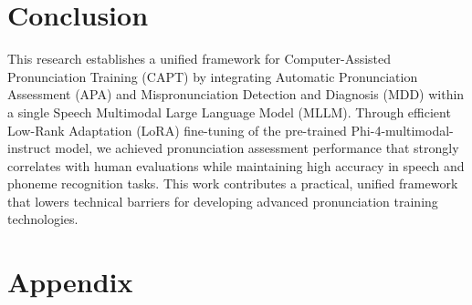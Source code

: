 \documentclass[sigconf,nonacm]{acmart}
\begin{document}
\section{Conclusion}
This research establishes a unified framework for Computer-Assisted Pronunciation Training (CAPT) by integrating Automatic Pronunciation Assessment (APA) and Mispronunciation Detection and Diagnosis (MDD) within a single Speech Multimodal Large Language Model (MLLM).
Through efficient Low-Rank Adaptation (LoRA) fine-tuning of the pre-trained Phi-4-multimodal-instruct model, we achieved pronunciation assessment performance that strongly correlates with human evaluations while maintaining high accuracy in speech and phoneme recognition tasks. This work contributes a practical, unified framework that lowers technical barriers for developing advanced pronunciation training technologies.

\section{Appendix}
\end{document}
